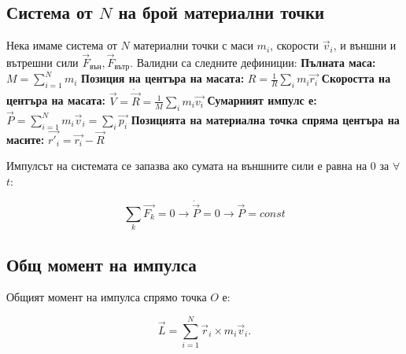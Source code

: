 \documentclass{report}
\begin{document}
\subsection{Система от $N$ на брой материални точки}

Нека имаме система от \( N \) материални точки с маси \( m_i \), скорости \( \vec{v}_i \), и външни и вътрешни сили \( \vec{F}_{\text{вън}}, \vec{F}_{\text{вътр}} \).
Валидни са следните дефиниции:
\newline
\newline
\textbf{Пълната маса:}
 $M=\sum_{i=1}^{N}m_i$
 \newline
 \newline
\textbf{Позиция на центъра на масата:}
 $R=\frac{1}{R}\sum_{i}^{}m_i\vec{r_i}$
 \newline
 \newline
\textbf{Скоростта на центъра на масата:}
 $\vec{V}=\dot{\vec{R}}=\frac{1}{M}\sum_{i}^{}m_i\vec{v_i}$
 \newline\newline
\textbf{Сумарният импулс е:}
$\vec{P} = \sum_{i=1}^N m_i \vec{v}_i=\sum_{i}^{}\vec{p_i}$
\newline
\newline
\textbf{Позицията на материална точка спряма центъра на масите:}
$\vec{r'_i}=\vec{r_i}-\vec{R}$



Импулсът на системата се запазва ако сумата на външните сили е равна на 0 за $\forall$ $t$:

\begin{equation}
    \sum_k\vec{F_k}=0\rightarrow \dot{\vec{P}}=0 \rightarrow \vec{P}=const
\end{equation}


\subsection{Общ момент на импулса}

Общият момент на импулса спрямо точка \( O \) е:

\begin{equation}
\vec{L} = \sum_{i=1}^N \vec{r}_i \times m_i \vec{v}_i.
\end{equation}
\end{document}
